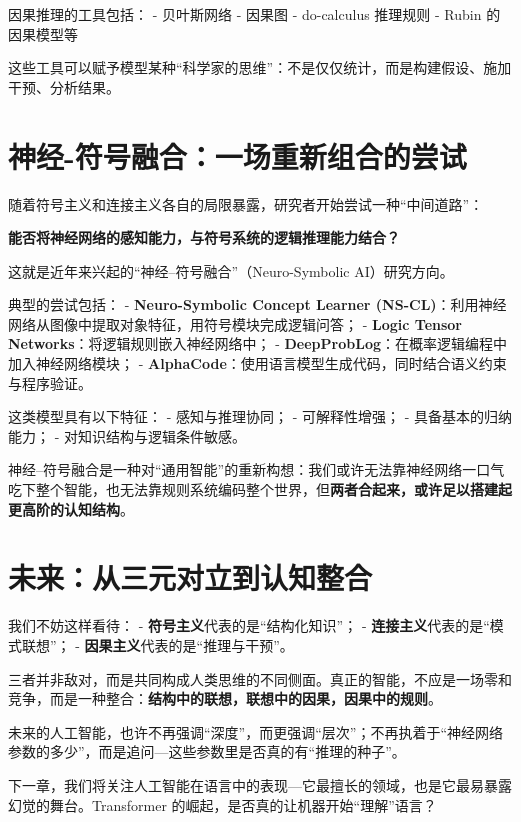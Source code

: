因果推理的工具包括：
- 贝叶斯网络
- 因果图
- do-calculus 推理规则
- Rubin 的因果模型等

这些工具可以赋予模型某种“科学家的思维”：不是仅仅统计，而是构建假设、施加干预、分析结果。

\section*{神经-符号融合：一场重新组合的尝试}

随着符号主义和连接主义各自的局限暴露，研究者开始尝试一种“中间道路”：

\textbf{能否将神经网络的感知能力，与符号系统的逻辑推理能力结合？}

这就是近年来兴起的“神经–符号融合”（Neuro-Symbolic AI）研究方向。

典型的尝试包括：
- \textbf{Neuro-Symbolic Concept Learner (NS-CL)}：利用神经网络从图像中提取对象特征，用符号模块完成逻辑问答；
- \textbf{Logic Tensor Networks}：将逻辑规则嵌入神经网络中；
- \textbf{DeepProbLog}：在概率逻辑编程中加入神经网络模块；
- \textbf{AlphaCode}：使用语言模型生成代码，同时结合语义约束与程序验证。

这类模型具有以下特征：
- 感知与推理协同；
- 可解释性增强；
- 具备基本的归纳能力；
- 对知识结构与逻辑条件敏感。

神经–符号融合是一种对“通用智能”的重新构想：我们或许无法靠神经网络一口气吃下整个智能，也无法靠规则系统编码整个世界，但\textbf{两者合起来，或许足以搭建起更高阶的认知结构}。

\section*{未来：从三元对立到认知整合}

我们不妨这样看待：
- \textbf{符号主义}代表的是“结构化知识”；
- \textbf{连接主义}代表的是“模式联想”；
- \textbf{因果主义}代表的是“推理与干预”。

三者并非敌对，而是共同构成人类思维的不同侧面。真正的智能，不应是一场零和竞争，而是一种整合：\textbf{结构中的联想，联想中的因果，因果中的规则}。

未来的人工智能，也许不再强调“深度”，而更强调“层次”；不再执着于“神经网络参数的多少”，而是追问---这些参数里是否真的有“推理的种子”。

下一章，我们将关注人工智能在语言中的表现---它最擅长的领域，也是它最易暴露幻觉的舞台。Transformer 的崛起，是否真的让机器开始“理解”语言？

\nocite{*}
\printbibliography[heading=bibintoc, title=\ebibname]

\newpage
